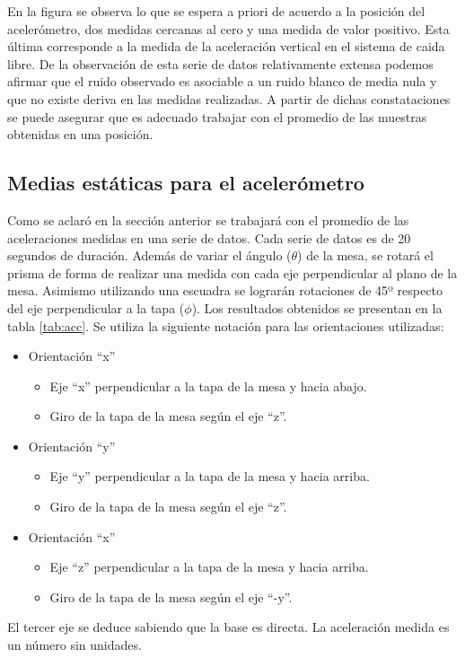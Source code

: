 \documentclass[main]{subfiles}
\begin{document}
En la figura se observa lo que se espera a priori de acuerdo a la posici\'on del aceler\'ometro, dos medidas cercanas al cero y una medida de valor positivo. Esta \'ultima corresponde a la medida de la aceleraci\'on vertical en el sistema de caida libre. De la observaci\'on de esta serie de datos relativamente extensa podemos afirmar que el ruido observado es asociable a un ruido blanco de media nula y que no existe deriva en las medidas realizadas. A partir de dichas constataciones se puede asegurar que es adecuado trabajar con el promedio de las muestras obtenidas en una posici\'on.


\subsection{Medias estáticas para el acelerómetro}

Como se aclaró en la sección anterior se trabajará con el promedio de las aceleraciones medidas en una serie de datos. Cada serie de datos es de 20 segundos de duración. Además de variar el ángulo ($\theta$) de la mesa, se rotará el prisma de forma de realizar una medida con cada eje perpendicular al plano de la mesa. Asimismo utilizando una escuadra se lograrán rotaciones de 45º respecto del eje perpendicular a la tapa ($\phi$). Los resultados obtenidos se presentan en la tabla \ref{tab:acc}. Se utiliza la siguiente notación para las orientaciones utilizadas:
\begin{itemize}
	\item Orientación ``x''
	\begin{itemize}
		\item Eje ``x'' perpendicular a la tapa de la mesa y hacia abajo.
		\item Giro de la tapa de la mesa según el eje ``z''.
	\end{itemize}
	\item Orientación ``y''
	\begin{itemize}
		\item Eje ``y'' perpendicular a la tapa de la mesa y hacia arriba.
		\item Giro de la tapa de la mesa según el eje ``z''.
	\end{itemize}
	\item Orientación ``x''
	\begin{itemize}
		\item Eje ``z'' perpendicular a la tapa de la mesa y hacia arriba.
		\item Giro de la tapa de la mesa según el eje ``-y''.
	\end{itemize}
\end{itemize}
El tercer eje se deduce sabiendo que la base es directa. La aceleración medida es un número sin unidades.
\end{document}
